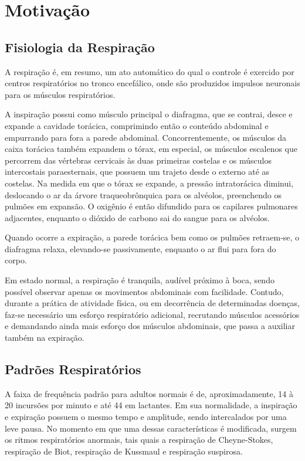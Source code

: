\chapter{Motivação}
  
\section{Fisiologia da Respiração} \label{sec:fisiologiadarespiracao}

	A respiração é, em resumo, um ato automático do qual o controle é exercido por centros respiratórios no tronco encefálico, onde são produzidos impulsos neuronais para os músculos respiratórios. 
	
	A inspiração possui como músculo principal o diafragma, que se contrai, desce e expande a cavidade torácica, comprimindo então o conteúdo abdominal e empurrando para fora a parede abdominal. Concorrentemente, os músculos da caixa torácica também expandem o tórax, em especial, os músculos escalenos que percorrem das vértebras cervicais às duas primeiras costelas e os músculos intercostais paraesternais, que possuem um trajeto desde o externo até as costelas. Na medida em que o tórax se expande, a pressão intratorácica diminui, deslocando o ar da árvore traqueobrônquica para os alvéolos, preenchendo os pulmões em expansão. O oxigênio é então difundido para os capilares pulmonares adjacentes, enquanto o dióxido de carbono sai do sangue para os alvéolos.
	
	Quando ocorre a expiração, a parede torácica bem como os pulmões retraem-se, o diafragma relaxa, elevando-se passivamente, enquanto o ar flui para fora do corpo.
	
	Em estado normal, a respiração é tranquila, audível próximo à boca, sendo possível observar apenas os movimentos abdominais com facilidade. Contudo, durante a prática de atividade física, ou em decorrência de determinadas doenças, faz-se necessário um esforço respiratório adicional, recrutando músculos acessórios e demandando ainda mais esforço dos músculos abdominais, que passa a auxiliar também na expiração.
	
\section{Padrões Respiratórios} \label{sec:padroesrespiratorios}

	A faixa de frequência padrão para adultos normais é de, aproximadamente, 14 à 20 incursões por minuto e até 44 em lactantes. Em sua normalidade, a inspiração e expiração possuem o mesmo tempo e amplitude, sendo intercalados por uma leve pausa. No momento em que uma dessas características é modificada, surgem os ritmos respiratórios anormais, tais quais a respiração de Cheyne-Stokes, respiração de Biot, respiração de Kussmaul e respiração suspirosa.
	
